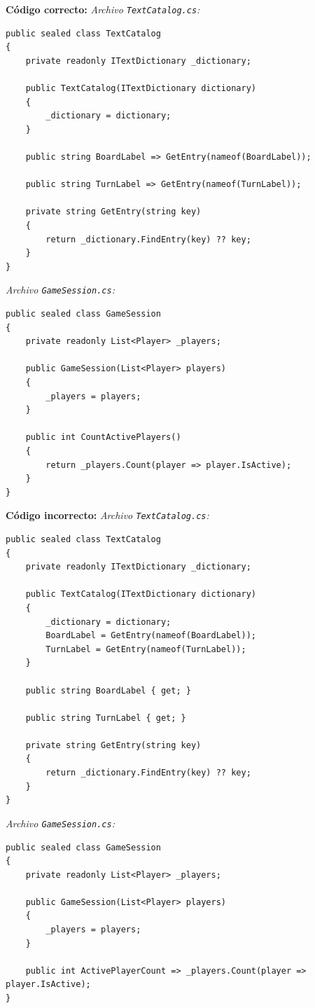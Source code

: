 \textbf{Código correcto:}
\textit{Archivo \texttt{TextCatalog.cs}:}
\begin{lstlisting}[style=csharpstyle]
public sealed class TextCatalog
{
    private readonly ITextDictionary _dictionary;

    public TextCatalog(ITextDictionary dictionary)
    {
        _dictionary = dictionary;
    }

    public string BoardLabel => GetEntry(nameof(BoardLabel));

    public string TurnLabel => GetEntry(nameof(TurnLabel));

    private string GetEntry(string key)
    {
        return _dictionary.FindEntry(key) ?? key;
    }
}
\end{lstlisting}

\textit{Archivo \texttt{GameSession.cs}:}
\begin{lstlisting}[style=csharpstyle]
public sealed class GameSession
{
    private readonly List<Player> _players;

    public GameSession(List<Player> players)
    {
        _players = players;
    }

    public int CountActivePlayers()
    {
        return _players.Count(player => player.IsActive);
    }
}
\end{lstlisting}

\textbf{Código incorrecto:}
\textit{Archivo \texttt{TextCatalog.cs}:}
\begin{lstlisting}[style=csharpstyle]
public sealed class TextCatalog
{
    private readonly ITextDictionary _dictionary;

    public TextCatalog(ITextDictionary dictionary)
    {
        _dictionary = dictionary;
        BoardLabel = GetEntry(nameof(BoardLabel));
        TurnLabel = GetEntry(nameof(TurnLabel));
    }

    public string BoardLabel { get; }

    public string TurnLabel { get; }

    private string GetEntry(string key)
    {
        return _dictionary.FindEntry(key) ?? key;
    }
}
\end{lstlisting}

\textit{Archivo \texttt{GameSession.cs}:}
\begin{lstlisting}[style=csharpstyle]
public sealed class GameSession
{
    private readonly List<Player> _players;

    public GameSession(List<Player> players)
    {
        _players = players;
    }

    public int ActivePlayerCount => _players.Count(player => player.IsActive);
}
\end{lstlisting}

